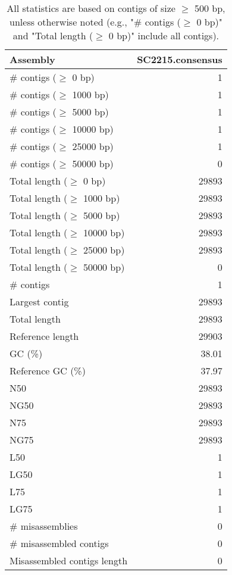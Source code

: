 \documentclass[12pt,a4paper]{article}
\begin{document}
\begin{table}[ht]
\begin{center}
\caption{All statistics are based on contigs of size $\geq$ 500 bp, unless otherwise noted (e.g., "\# contigs ($\geq$ 0 bp)" and "Total length ($\geq$ 0 bp)" include all contigs).}
\begin{tabular}{|l*{1}{|r}|}
\hline
Assembly & SC2215.consensus \\ \hline
\# contigs ($\geq$ 0 bp) & 1 \\ \hline
\# contigs ($\geq$ 1000 bp) & 1 \\ \hline
\# contigs ($\geq$ 5000 bp) & 1 \\ \hline
\# contigs ($\geq$ 10000 bp) & 1 \\ \hline
\# contigs ($\geq$ 25000 bp) & 1 \\ \hline
\# contigs ($\geq$ 50000 bp) & 0 \\ \hline
Total length ($\geq$ 0 bp) & 29893 \\ \hline
Total length ($\geq$ 1000 bp) & 29893 \\ \hline
Total length ($\geq$ 5000 bp) & 29893 \\ \hline
Total length ($\geq$ 10000 bp) & 29893 \\ \hline
Total length ($\geq$ 25000 bp) & 29893 \\ \hline
Total length ($\geq$ 50000 bp) & 0 \\ \hline
\# contigs & 1 \\ \hline
Largest contig & 29893 \\ \hline
Total length & 29893 \\ \hline
Reference length & 29903 \\ \hline
GC (\%) & 38.01 \\ \hline
Reference GC (\%) & 37.97 \\ \hline
N50 & 29893 \\ \hline
NG50 & 29893 \\ \hline
N75 & 29893 \\ \hline
NG75 & 29893 \\ \hline
L50 & 1 \\ \hline
LG50 & 1 \\ \hline
L75 & 1 \\ \hline
LG75 & 1 \\ \hline
\# misassemblies & 0 \\ \hline
\# misassembled contigs & 0 \\ \hline
Misassembled contigs length & 0 \\ \hline

\end{tabular}
\end{center}
\end{table}
\end{document}
